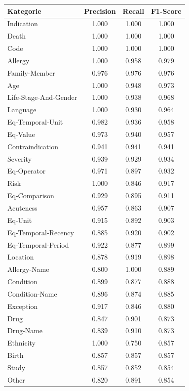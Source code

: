 \begin{table}[htbp]
\centering
\begin{tabular}{p{5cm}ccc}
\toprule
\textbf{Kategorie} & \textbf{Precision} & \textbf{Recall} & \textbf{F1-Score} \\
\midrule
Indication & 1.000 & 1.000 & 1.000 \\
Death & 1.000 & 1.000 & 1.000 \\
Code & 1.000 & 1.000 & 1.000 \\
Allergy & 1.000 & 0.958 & 0.979 \\
Family-Member & 0.976 & 0.976 & 0.976 \\
Age & 1.000 & 0.948 & 0.973 \\
Life-Stage-And-Gender & 1.000 & 0.938 & 0.968 \\
Language & 1.000 & 0.930 & 0.964 \\
Eq-Temporal-Unit & 0.982 & 0.936 & 0.958 \\
Eq-Value & 0.973 & 0.940 & 0.957 \\
Contraindication & 0.941 & 0.941 & 0.941 \\
Severity & 0.939 & 0.929 & 0.934 \\
Eq-Operator & 0.971 & 0.897 & 0.932 \\
Risk & 1.000 & 0.846 & 0.917 \\
Eq-Comparison & 0.929 & 0.895 & 0.911 \\
Acuteness & 0.957 & 0.863 & 0.907 \\
Eq-Unit & 0.915 & 0.892 & 0.903 \\
Eq-Temporal-Recency & 0.885 & 0.920 & 0.902 \\
Eq-Temporal-Period & 0.922 & 0.877 & 0.899 \\
Location & 0.878 & 0.919 & 0.898 \\
Allergy-Name & 0.800 & 1.000 & 0.889 \\
Condition & 0.899 & 0.877 & 0.888 \\
Condition-Name & 0.896 & 0.874 & 0.885 \\
Exception & 0.917 & 0.846 & 0.880 \\
Drug & 0.847 & 0.901 & 0.873 \\
Drug-Name & 0.839 & 0.910 & 0.873 \\
Ethnicity & 1.000 & 0.750 & 0.857 \\
Birth & 0.857 & 0.857 & 0.857 \\
Study & 0.857 & 0.852 & 0.854 \\
Other & 0.820 & 0.891 & 0.854 \\

\end{tabular}
\end{table}
